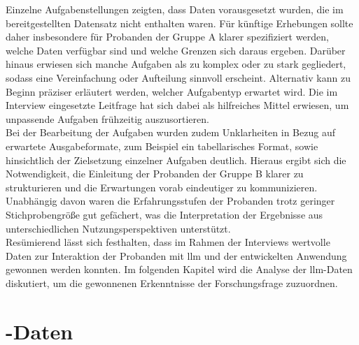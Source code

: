 
Einzelne Aufgabenstellungen zeigten, dass Daten vorausgesetzt wurden, die im bereitgestellten Datensatz nicht enthalten waren.
Für künftige Erhebungen sollte daher insbesondere für Probanden der Gruppe A klarer spezifiziert werden, welche Daten verfügbar sind und welche Grenzen sich daraus ergeben.
Darüber hinaus erwiesen sich manche Aufgaben als zu komplex oder zu stark gegliedert, sodass eine Vereinfachung oder Aufteilung sinnvoll erscheint.
Alternativ kann zu Beginn präziser erläutert werden, welcher Aufgabentyp erwartet wird.
Die im Interview eingesetzte Leitfrage hat sich dabei als hilfreiches Mittel erwiesen, um unpassende Aufgaben frühzeitig auszusortieren. \\

Bei der Bearbeitung der Aufgaben wurden zudem Unklarheiten in Bezug auf erwartete Ausgabeformate, zum Beispiel ein tabellarisches Format, sowie hinsichtlich der Zielsetzung einzelner Aufgaben deutlich.
Hieraus ergibt sich die Notwendigkeit, die Einleitung der Probanden der Gruppe B klarer zu strukturieren und die Erwartungen vorab eindeutiger zu kommunizieren.
Unabhängig davon waren die Erfahrungsstufen der Probanden trotz geringer Stichprobengröße gut gefächert, was die Interpretation der Ergebnisse aus unterschiedlichen Nutzungsperspektiven unterstützt. \\

Resümierend lässt sich festhalten, dass im Rahmen der Interviews wertvolle Daten zur Interaktion der Probanden mit \gls{llm} und der entwickelten Anwendung gewonnen werden konnten.
Im folgenden Kapitel wird die Analyse der \gls{llm}-Daten diskutiert, um die gewonnenen Erkenntnisse der Forschungsfrage zuzuordnen.

\section{-Daten}
\label{sec:discussion-llm-data}

